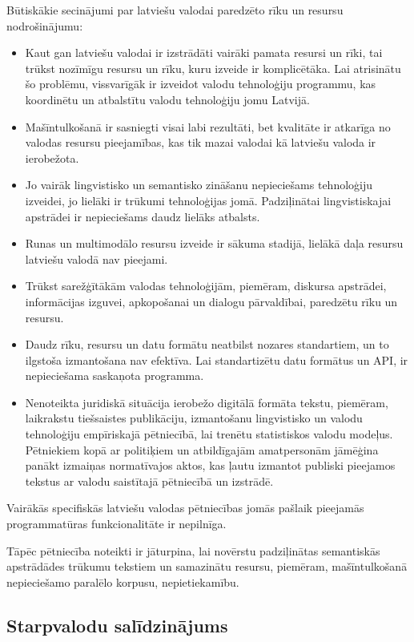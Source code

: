 \begin{multicols}{2}
Būtiskākie secinājumi par latviešu valodai paredzēto rīku un resursu nodrošinājumu:

\begin{itemize}
\item  Kaut gan latviešu valodai ir izstrādāti vairāki pamata resursi un rīki, tai trūkst nozīmīgu resursu un rīku, kuru izveide ir komplicētāka.
Lai atrisinātu šo problēmu, vissvarīgāk ir izveidot valodu tehnoloģiju programmu, kas koordinētu un atbalstītu valodu tehnoloģiju jomu Latvijā.
\item  Mašīntulkošanā ir sasniegti visai labi rezultāti, bet kvalitāte ir atkarīga no valodas resursu pieejamības, kas tik mazai valodai kā latviešu valoda ir ierobežota.
\item  Jo vairāk lingvistisko un semantisko zināšanu nepieciešams tehnoloģiju izveidei, jo lielāki ir trūkumi tehnoloģijas jomā.
Padziļinātai lingvistiskajai apstrādei ir nepieciešams daudz lielāks atbalsts.
\item  Runas un multimodālo resursu izveide ir sākuma stadijā, lielākā daļa resursu latviešu valodā nav pieejami.
\item  Trūkst sarežģītākām valodas tehnoloģijām, piemēram, diskursa apstrādei, informācijas izguvei, apkopošanai un dialogu pārvaldībai, paredzētu rīku un resursu.
\item  Daudz rīku, resursu un datu formātu neatbilst nozares standartiem, un to ilgstoša izmantošana nav efektīva.
Lai standartizētu datu formātus un API, ir nepieciešama saskaņota programma.
\item  Nenoteikta juridiskā situācija ierobežo digitālā formāta tekstu, piemēram, laikrakstu tiešsaistes publikāciju, izmantošanu lingvistisko un valodu tehnoloģiju empīriskajā pētniecībā, lai trenētu statistiskos valodu modeļus.
Pētniekiem kopā ar politiķiem un atbildīgajām amatpersonām jāmēģina panākt izmaiņas normatīvajos aktos, kas ļautu izmantot publiski pieejamos tekstus ar valodu saistītajā pētniecībā un izstrādē.
\end{itemize}

Vairākās specifiskās latviešu valodas pētniecības jomās pašlaik pieejamās programmatūras funkcionalitāte ir nepilnīga.

Tāpēc pētniecība noteikti ir jāturpina, lai novērstu padziļinātas semantiskās apstrādādes trūkumu tekstiem un samazinātu resursu, piemēram, mašīntulkošanā nepieciešamo paralēlo korpusu, nepietiekamību.

\subsection{Starpvalodu salīdzinājums}


\end{multicols}
